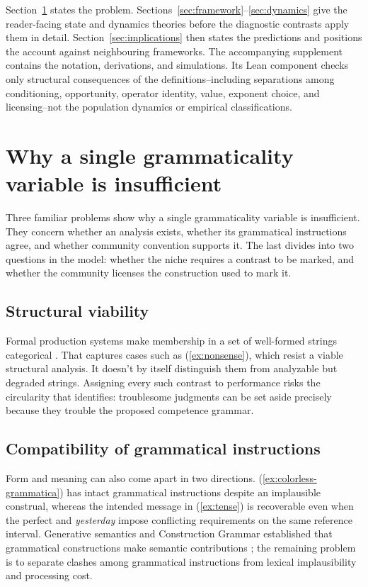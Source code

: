 \documentclass[12pt,letterpaper]{article}
\newcommand{\mention}[1]{\textit{#1}}
\begin{document}
Section~\ref{sec:previous} states the problem. Sections~\ref{sec:framework}--\ref{sec:dynamics}
give the reader-facing state and dynamics theories before
the diagnostic contrasts apply them in detail. Section~\ref{sec:implications}
then states the predictions and positions the account against neighbouring
frameworks. The accompanying supplement contains the notation, derivations, and
simulations. Its Lean component checks only structural consequences of the
definitions--including separations among conditioning, opportunity, operator
identity, value, exponent choice, and licensing--not the population dynamics or
empirical classifications.

\section{Why a single grammaticality variable is insufficient}\label{sec:previous}

Three familiar problems show why a single grammaticality variable is
insufficient. They concern whether an analysis exists, whether its grammatical
instructions agree, and whether community convention supports it. The last
divides into two questions in the model: whether the niche requires a contrast
to be marked, and whether the community licenses the construction used to mark
it.

\subsection{Structural viability}\label{sec:impasse-viability}

Formal production systems make membership in a set of well-formed strings
categorical \autocite{post1943,chomsky1957}. That captures cases such as
(\ref{ex:nonsense}), which resist a viable structural analysis. It doesn't by
itself distinguish them from analyzable but degraded strings. Assigning every
such contrast to performance risks the circularity that
\textcite[71]{schutze2016} identifies: troublesome judgments can be set aside
precisely because they trouble the proposed competence grammar.

\subsection{Compatibility of grammatical instructions}\label{sec:impasse-coherence}

Form and meaning can also come apart in two directions.
(\ref{ex:colorless-grammatica}) has intact grammatical instructions despite an
implausible construal, whereas the intended message in (\ref{ex:tense}) is
recoverable even when the perfect and \mention{yesterday} impose conflicting
requirements on the same reference interval. Generative semantics and
Construction Grammar established
that grammatical constructions make semantic contributions
\autocite{lakoff1971,mccawley1968,goldberg1995constructions}; the remaining
problem is to separate clashes among grammatical instructions from lexical
implausibility and processing cost.
\end{document}
